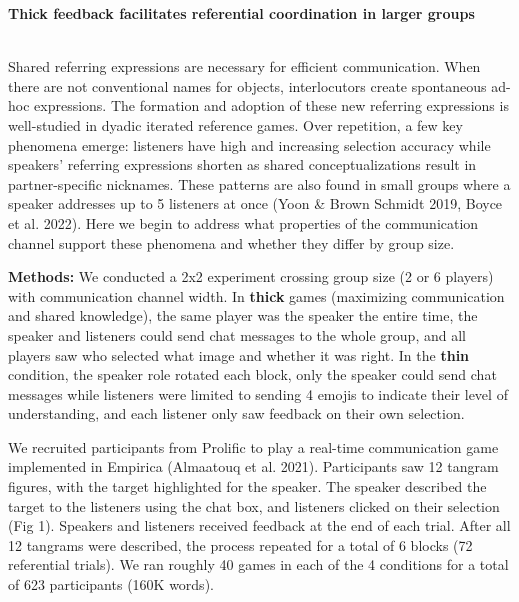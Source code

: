 \documentclass[11pt,a4paper]{article}
\renewcommand{\title}[1]{\textbf{#1}\\}
\newcommand{\authors}[1]{\iftoggle{anonymous}{\phantom{#1}}{#1}\\}
\newcommand{\email}[1]{\iftoggle{anonymous}{\phantom{#1}}{#1}}
\begin{document}


\title{Thick feedback facilitates referential coordination in larger groups}
\authors{Veronica Boyce\textsuperscript{1}, Robert D.  Hawkins\textsuperscript{2}, Noah D. Goodman\textsuperscript{1}, Michael C. Frank\textsuperscript{1}} 
\email{vboyce@stanford.edu;  \textsuperscript{1}Stanford, \textsuperscript{2}Princeton}
\newline
%

Shared referring expressions are necessary for efficient communication. When there are not conventional names for objects, interlocutors create spontaneous ad-hoc expressions. The formation and adoption of these new referring expressions is well-studied in dyadic iterated reference games. Over repetition, a few key phenomena emerge: listeners have high and increasing selection accuracy while speakers' referring expressions shorten as shared conceptualizations result in partner-specific nicknames. These patterns are also found in small groups where a speaker addresses up to 5 listeners at once (Yoon \& Brown Schmidt 2019, Boyce et al. 2022). Here we begin to address what properties of the communication channel support these phenomena and whether they differ by group size.

\textbf{Methods:} We conducted a 2x2 experiment crossing group size (2 or 6 players) with communication channel width. In \textbf{thick} games (maximizing communication and shared knowledge), the same player was the speaker the entire time, the speaker and listeners could send chat messages to the whole group, and all players saw who selected what image and whether it was right. In the \textbf{thin} condition, the speaker role rotated each block, only the speaker could send chat messages while listeners were limited to sending 4 emojis to indicate their level of understanding, and each listener only saw feedback on their own selection.

We recruited participants from Prolific to play a real-time communication game implemented in Empirica (Almaatouq et al. 2021). Participants saw 12 tangram figures, with the target highlighted for the speaker. The speaker described the target to the listeners using the chat box, and listeners clicked on their selection (Fig 1). Speakers and listeners received feedback at the end of each trial. After all 12 tangrams were described, the process repeated for a total of 6 blocks (72 referential trials). We ran roughly 40 games in each of the 4 conditions for a total of 623 participants (160K words). 
\end{document}
